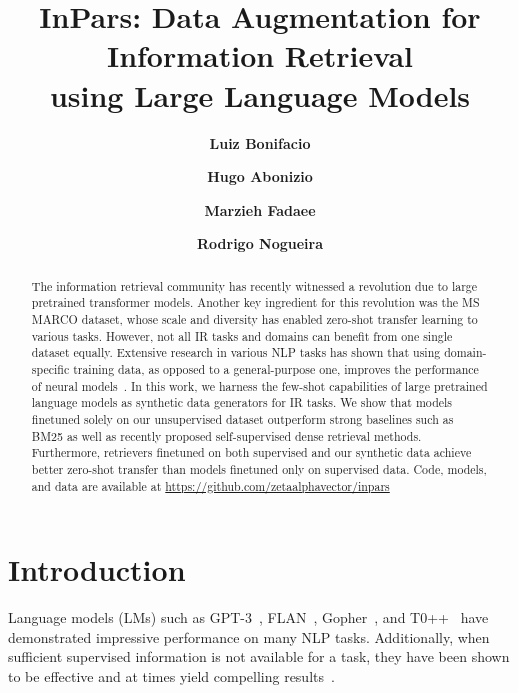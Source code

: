 \documentclass[11pt]{article}
\title{InPars: Data Augmentation for Information Retrieval \\using Large Language Models
}
\author[$\dagger\diamond\ddagger\star$]{\textbf{Luiz Bonifacio}}
\author[$\dagger\diamond\star$]{\textbf{Hugo Abonizio}}
\author[$\dagger\star$]{\textbf{Marzieh Fadaee}}
\author[$\dagger\diamond\ddagger\triangleleft\star$]{\textbf{Rodrigo Nogueira}}
\affil[$\dagger$]{Zeta Alpha}
\affil[$\diamond$]{NeuralMind}
\affil[$\ddagger$]{University of Campinas}
\affil[$\triangleleft$]{University of Waterloo}
\affil[$\star$]{\small All authors contributed equally.}
\begin{document}
\maketitle

\begin{abstract}
The information retrieval community has recently witnessed a revolution due to large pretrained transformer models. Another key ingredient for this revolution was the MS MARCO dataset, whose scale and diversity has enabled zero-shot transfer learning to various tasks.
However, not all IR tasks and domains can benefit from one single dataset equally. 
Extensive research in various NLP tasks has shown that using domain-specific training data, as opposed to a general-purpose one, improves the performance of neural models~\cite{yu2021adaptsum,sharami2022selecting}.
In this work, we harness the few-shot capabilities of large pretrained language models as synthetic data generators for IR tasks.
We show that models finetuned solely on our unsupervised dataset outperform strong baselines such as BM25 as well as recently proposed self-supervised dense retrieval methods.
Furthermore, retrievers finetuned on both supervised and our synthetic data achieve better zero-shot transfer than models finetuned only on supervised data. 
Code, models, and data are available at \url{https://github.com/zetaalphavector/inpars}
\end{abstract}


\section{Introduction}

Language models (LMs) such as GPT-3~\cite{DBLP:journals/corr/abs-2005-14165}, FLAN~\cite{wei2022finetuned}, Gopher~\cite{rae2021scaling}, and T0++~\cite{sanh2021multitask} have demonstrated impressive performance on many NLP tasks.
Additionally, when sufficient supervised information is not available for a task, they have been shown to be effective and at times yield compelling results~\cite{winata-etal-2021-language,schick-schutze-2021-just}.
\end{document}

